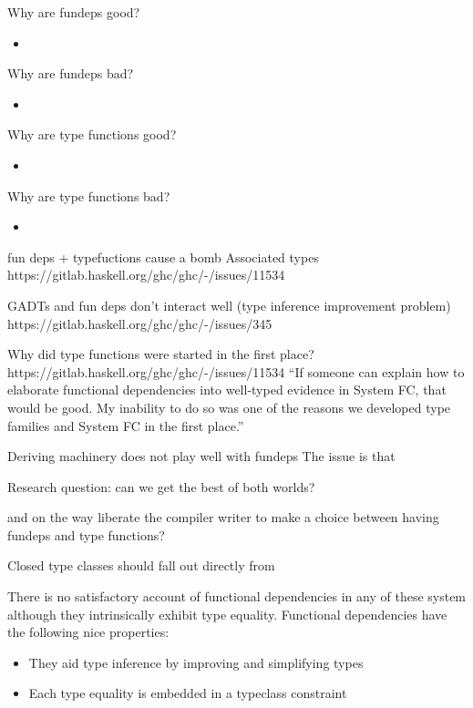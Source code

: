 \documentclass[screen,nonacm]{acmart}
\begin{document}
Why are fundeps good?
\begin{itemize}
\item
\end{itemize}

Why are fundeps bad?
\begin{itemize}
\item
\end{itemize}

Why are type functions good?
\begin{itemize}
\item
\end{itemize}

Why are type functions bad?
\begin{itemize}
\item
\end{itemize}

fun deps + typefuctions cause a bomb
Associated types https://gitlab.haskell.org/ghc/ghc/-/issues/11534

GADTs and fun deps don't interact well (type inference improvement problem)
https://gitlab.haskell.org/ghc/ghc/-/issues/345

Why did type functions were started in the first place?
https://gitlab.haskell.org/ghc/ghc/-/issues/11534
``If someone can explain how to elaborate functional dependencies into well-typed evidence in System FC, that would be good. My inability to do so was one of the reasons we developed type families and System FC in the first place.''

Deriving machinery does not play well with fundeps
The issue is that

Research question:
can we get the best of both worlds?

and on the way liberate the compiler writer to make a choice between
having fundeps and type functions?

Closed type classes should fall out directly from


There is no satisfactory account of functional
dependencies in any of these system although they intrinsically exhibit
type equality. Functional dependencies have the following nice
properties\cite{jones_simplifying_1995}:
\begin{itemize}
\item They aid type inference by improving and simplifying types
\item Each type equality is embedded in a typeclass constraint
\end{itemize}
\end{document}
